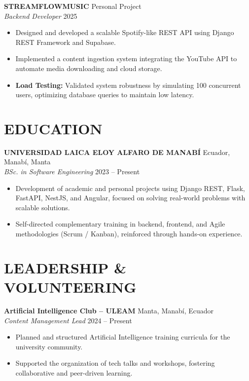 \documentclass[11pt, a4paper]{article}
\begin{document}
\vspace{4pt}

\textbf{STREAMFLOWMUSIC} \hfill Personal Project \\
\textit{Backend Developer} \hfill 2025

\begin{itemize}
\item Designed and developed a scalable Spotify-like REST API using Django REST Framework and Supabase.
\item Implemented a content ingestion system integrating the YouTube API to automate media downloading and cloud storage.
\item \textbf{Load Testing:} Validated system robustness by simulating 100 concurrent users, optimizing database queries to maintain low latency.
\end{itemize}

\section*{EDUCATION}

\textbf{UNIVERSIDAD LAICA ELOY ALFARO DE MANABÍ} \hfill Ecuador, Manabí, Manta \\
\textit{BSc. in Software Engineering} \hfill 2023 -- Present

\begin{itemize}
\item Development of academic and personal projects using Django REST, Flask, FastAPI, NestJS, and Angular, focused on solving real-world problems with scalable solutions.
\item Self-directed complementary training in backend, frontend, and Agile methodologies (Scrum / Kanban), reinforced through hands-on experience.
\end{itemize}

\section*{LEADERSHIP \& VOLUNTEERING}

\textbf{Artificial Intelligence Club -- ULEAM} \hfill Manta, Manabí, Ecuador \\
\textit{Content Management Lead} \hfill 2024 -- Present

\begin{itemize}
\item Planned and structured Artificial Intelligence training curricula for the university community.
\item Supported the organization of tech talks and workshops, fostering collaborative and peer-driven learning.
\end{itemize}
\end{document}
